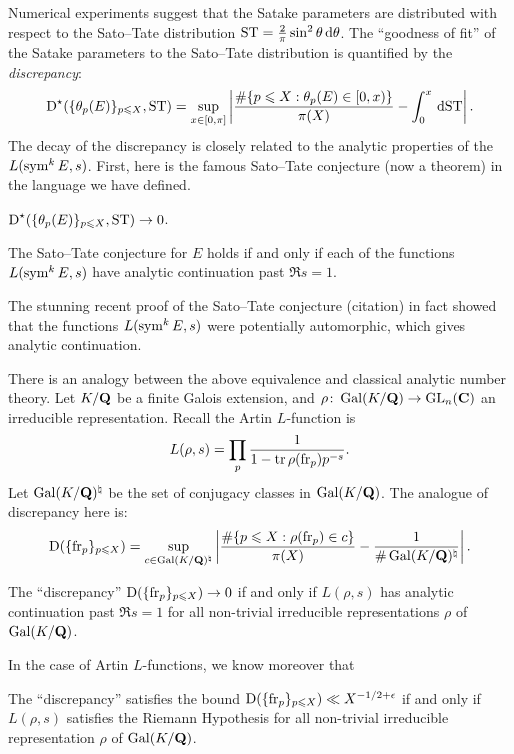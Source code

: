 Numerical experiments suggest that the Satake parameters are distributed with 
respect to the Sato--Tate distribution 
$\mathrm{ST} = \frac{2}{\pi} \sin^2\theta\, \mathrm{d}\theta$. The ``goodness of fit'' of the 
Satake parameters to the Sato--Tate distribution is quantified by the 
\emph{discrepancy}:
\[
	\operatorname{D}^\star(\{\theta_p(E)\}_{p\leqslant X}, \mathrm{ST}) = \sup_{x\in [0,\pi]} \left| \frac{\#\{p\leqslant X : \theta_p(E)\in [0,x)\}}{\pi(X)} - \int_0^x \, \mathrm{d} \mathrm{ST}\right| .
\]
The decay of the discrepancy is closely related to the analytic properties of 
the $L(\operatorname{sym}^k E,s)$. First, here is the famous Sato--Tate conjecture (now a 
theorem) in the language we have defined. 

\begin{theorem}
$\operatorname{D}^\star(\{\theta_p(E)\}_{p\leqslant X}, \mathrm{ST}) \to 0$.  
\end{theorem}

\begin{theorem}
The Sato--Tate conjecture for $E$ holds if and only if each of the functions 
$L(\operatorname{sym}^k E,s)$ have analytic continuation past $\Re s=1$. 
\end{theorem}

The stunning recent proof of the Sato--Tate conjecture (citation) in fact 
showed that the functions $L(\operatorname{sym}^k E,s)$ were potentially automorphic, which 
gives analytic continuation. 

There is an analogy between the above equivalence and classical analytic number 
theory. Let $K/\mathbf{Q}$ be a finite Galois extension, and 
$\rho\colon \operatorname{Gal}(K/\mathbf{Q}) \to \operatorname{GL}_n(\mathbf{C})$ an irreducible representation. Recall 
the Artin $L$-function is 
\[
	L(\rho,s) = \prod_p \frac{1}{1-\operatorname{tr} \rho(\mathrm{fr}_p) p^{-s}} .
\]
Let $\operatorname{Gal}(K/\mathbf{Q})^\natural$ be the set of conjugacy classes in $\operatorname{Gal}(K/\mathbf{Q})$. 
The analogue of discrepancy here is: 
\[
	\operatorname{D}(\{\mathrm{fr}_p\}_{p\leqslant X}) = \sup_{c\in \operatorname{Gal}(K/\mathbf{Q})^\natural} \left| \frac{\# \{p\leqslant X : \rho(\mathrm{fr}_p) \in c\}}{\pi(X)} - \frac{1}{\# \operatorname{Gal}(K/\mathbf{Q})^\natural}\right| .
\]

\begin{theorem}
The ``discrepancy'' $\operatorname{D}(\{\mathrm{fr}_p\}_{p\leqslant X})\to 0$ if and only 
if $L(\rho,s)$ has analytic continuation past $\Re s=1$ for all non-trivial 
irreducible representations $\rho$ of $\operatorname{Gal}(K/\mathbf{Q})$. 
\end{theorem}

In the case of Artin $L$-functions, we know moreover that 

\begin{theorem}
The ``discrepancy'' satisfies the bound 
$\operatorname{D}(\{\mathrm{fr}_p\}_{p\leqslant X}) \ll X^{-1/2+\epsilon}$ if and only if 
$L(\rho,s)$ satisfies the Riemann Hypothesis for all non-trivial irreducible 
representation $\rho$ of $\operatorname{Gal}(K/\mathbf{Q})$. 
\end{theorem}


